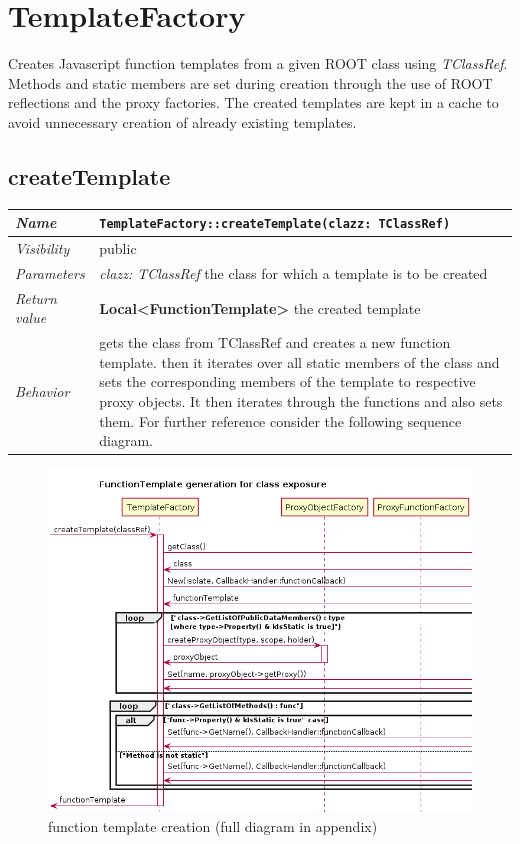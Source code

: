 \chapter{TemplateFactory}
Creates Javascript function templates from a given ROOT class using \textit{TClassRef}. Methods and static members are set during creation through the use of ROOT reflections and the proxy factories. 
The created templates are kept in a cache to avoid unnecessary creation of already existing templates.
\section{createTemplate}
\begin{longtable}{p{3cm} @{\hskip 1cm} p{12cm}}
 \hline
\textit{Name} & \texttt{TemplateFactory::createTemplate(clazz: TClassRef)}\\
\hline
 \textit{Visibility} & public\\
\hline
\textit{Parameters} & \textit{clazz: TClassRef} the class for which a template is to be created \\
\hline
\textit{Return value} & \textbf{ Local<FunctionTemplate>} the created template\\
  \hline
 \textit{Behavior} & gets the class from TClassRef and creates a new function template. 
			then it iterates over all static members of the class and sets the
			corresponding members of the template to respective proxy objects.
			It then iterates through the functions and also sets them.
			For further reference consider the following sequence diagram.\\
\hline
\end{longtable} \pagebreak
 
\begin{figure}[htb]
\includegraphics[width=16cm]{./latex/resources/functionTemplateGenerateCrop.png}
	\caption{function template creation (full diagram in appendix)}
\end{figure}
